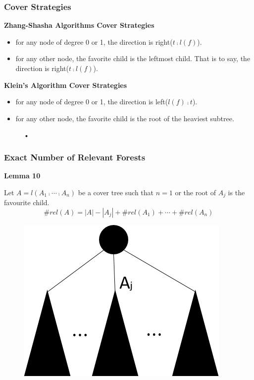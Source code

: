 \documentclass{beamer}
\begin{document}
\begin{frame}
\frametitle{Cover Strategies}
\textbf{Zhang-Shasha Algorithms Cover Strategies}
\begin{itemize}
\item for any node of degree 0 or 1, the direction is right($t \comp l(f)$).
\item for any other node, the favorite child is the leftmost child. That is to say, the direction is right($t \comp l(f)$).
\end{itemize}

\textbf{Klein's Algorithm Cover Strategies}
\begin{itemize}
\item for any node of degree 0 or 1, the direction is left($l(f) \comp t$).
\item for any other node, the favorite child is the root of the heaviest subtree.
\end{itemize}

\begin{figure}
	\centering  
		{  
			
		}
	\caption{•}
\end{figure} 
\end{frame}


\begin{frame}
\frametitle{Exact Number of Relevant Forests}
\textbf{Lemma 10}

Let $A=l(A_1 \comp \cdots \comp A_n)$ be a cover tree such that $n=1$ or the root of $A_j$ is the favourite child.
\begin{displaymath}
\#rel(A) = \left\vert A \right\vert - \left\vert A_j \right\vert + \#rel(A_1) + \cdots + \#rel(A_n)
\end{displaymath}
\begin{figure}
	\includegraphics[width=0.3\linewidth]{lemma10}
	\label{LEMMA 10} 
	\centering
\end{figure}
\end{frame}
\end{document}
